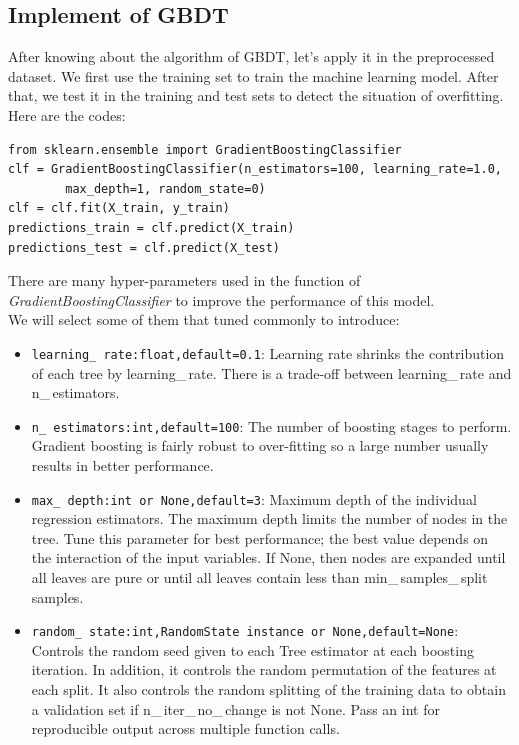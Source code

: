 \documentclass[12pt]{article}
\begin{document}
\subsection{Implement of GBDT}
After knowing about the algorithm of GBDT, let's apply it in the preprocessed dataset. We first use the training set to train the machine learning model. After that, we test it in the training and test sets to detect the situation of overfitting. Here are the codes:
\begin{verbatim}
from sklearn.ensemble import GradientBoostingClassifier
clf = GradientBoostingClassifier(n_estimators=100, learning_rate=1.0, 
        max_depth=1, random_state=0)
clf = clf.fit(X_train, y_train)
predictions_train = clf.predict(X_train)
predictions_test = clf.predict(X_test)
\end{verbatim}
There are many hyper-parameters used in the function of \textit{GradientBoostingClassifier} to improve the performance of this model.\\
We will select some of them that tuned commonly to introduce:\\
\begin{itemize}
    \item \texttt{{learning{\_{\,rate}}}:float,default=0.1}: Learning rate shrinks the contribution of each tree by learning{\_{\,rate}}. There is a trade-off between learning{\_{\,rate}} and n\_{\,estimators}.
    \item \texttt{n\_\,estimators:int,default=100}: The number of boosting stages to perform. Gradient boosting is fairly robust to over-fitting so a large number usually results in better performance.
    \item \texttt{max\_\,depth:int or None,default=3}: Maximum depth of the individual regression estimators. The maximum depth limits the number of nodes in the tree. Tune this parameter for best performance; the best value depends on the interaction of the input variables. If None, then nodes are expanded until all leaves are pure or until all leaves contain less than min\_\,samples\_\,split samples.
    \item \texttt{random\_\,state:int,RandomState instance or None,default=None}: Controls the random seed given to each Tree estimator at each boosting iteration. In addition, it controls the random permutation of the features at each split. It also controls the random splitting of the training data to obtain a validation set if n\_\,iter\_\,no\_\,change is not None. Pass an int for reproducible output across multiple function calls.
\end{itemize}
\end{document}
